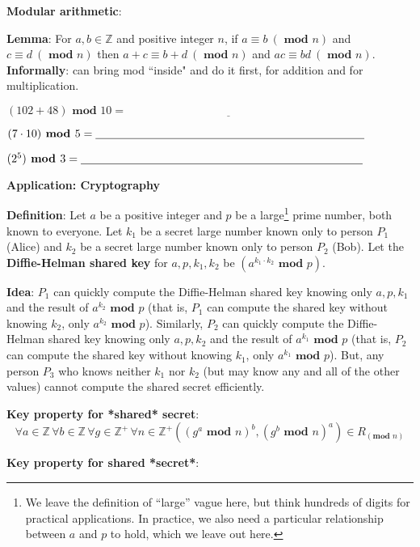 \documentclass[12pt, oneside]{article}
\begin{document}
{\bf Modular arithmetic}: 

{\bf Lemma}: For $a, b \in \mathbb{Z}$ 
and positive integer $n$, if $a \equiv b ~(\textbf{ mod } n)$ and $c \equiv d ~(\textbf{ mod } n)$ 
then $a+c \equiv b+d ~(\textbf{ mod } n)$ and $ac \equiv bd ~(\textbf{ mod } n)$.
{\bf Informally}: can bring mod ``inside" and do it first, for addition and for multiplication.


$(102 + 48) \textbf{ mod } 10 = \underline{\phantom{\hspace{3in}}} $ 

$(7 \cdot 10) \textbf{ mod } 5 = \underline{\phantom{\hspace{3.3in}}} $ 

$(2^5) \textbf{ mod } 3 =  \underline{\phantom{\hspace{3.45in}}} $ 

\vfill

 \newpage
{\bf Application: Cryptography}

{\bf Definition}: Let $a$ be a positive integer and $p$ be a 
large\footnote{We leave the definition of ``large'' vague here, but 
think hundreds of digits for practical applications. In practice, 
we also need a particular relationship between $a$ and $p$ to hold, 
which we leave out here.} prime number, both known to everyone. 
Let $k_1$ be a secret large number known only to person $P_1$ (Alice) 
and $k_2$ be a secret large number known only to person $P_2$ (Bob). 
Let the {\bf Diffie-Helman shared key} for $a, p, k_1, k_2$ be 
$(a^{k_1\cdot k_2} \textbf{ mod } p)$.


{\bf Idea}: $P_1$ can quickly compute the Diffie-Helman shared key 
knowing only $a, p, k_1$ and the result of $a^{k_2} \textbf{ mod } p$ 
(that is, $P_1$ can compute the shared key without knowing $k_2$, 
only $a^{k_2} \textbf{ mod } p$). Similarly, $P_2$ can 
quickly compute the Diffie-Helman shared key knowing only 
$a, p, k_2$ and the result of $a^{k_1} \textbf{ mod } p$ 
(that is, $P_2$ can compute the shared key without knowing $k_1$, 
only $a^{k_1} \textbf{ mod } p$). But, any person $P_3$ who 
knows neither $k_1$ nor $k_2$ (but may know any and all of the other values) 
cannot compute the shared secret efficiently.

{\bf Key property for *shared* secret}: 
\[
    \forall a \in \mathbb{Z} \, \forall b \in \mathbb{Z} \, \forall g \in \mathbb{Z}^+ \, 
    \forall n \in \mathbb{Z}^+ ((g^a \textbf{ mod } n)^b, (g^b \textbf{ mod } n)^a) \in R_{(\textbf{mod } n)}
\]

{\bf Key property for shared *secret*}:
\end{document}
